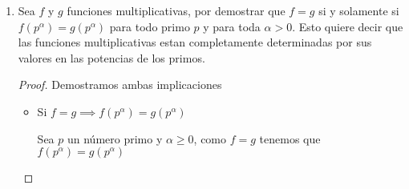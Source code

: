 \documentclass[12pt]{article}
\begin{document}
\begin{enumerate}
\begin{proof}
\begin{itemize}
                \begin{align*}
                    f(ab) &= f((p_1^{\alpha_1} \cdot p_2^{\alpha_2} \cdot \cdot \cdot p_s^{\alpha_s}) (q_1^{\beta_1} \cdot q_2^{\beta_2} \cdot \cdot \cdot q_r^{\beta_r}))\\
                          &= f(p_1^{\alpha_1}) \cdot f(p_2^{\alpha_2}) \cdot \cdot \cdot f(p_s^{\alpha_s})  f(q_1^{\beta_1}) \cdot f(q_2^{\beta_2}) \cdot \cdot \cdot f(q_r^{\beta_r}) \\
                          &= (f(p_1^{\alpha_1}) \cdot f(p_2^{\alpha_2}) \cdot \cdot \cdot f(p_s^{\alpha_s}))  (f(q_1^{\beta_1}) \cdot f(q_2^{\beta_2}) \cdot \cdot \cdot f(q_r^{\beta_r})) \\
                          &= f(p_1^{\alpha_1} \cdot p_2^{\alpha_2} \cdot \cdot \cdot p_s^{\alpha_s}) f( q_1^{\beta_1} \cdot q_2^{\beta_2} \cdot \cdot \cdot q_r^{\beta_r}) \\
                          &= f(a)f(b)
                \end{align*}
                
            Por lo tanto f es multiplicativa
        \end{itemize}
        
        Dado lo anterior concluimos que $f$ es multiplicativa si y solamente si $f(p_1^{\alpha_1} \cdot \cdot \cdot p_s^{\alpha_s}) = f(p_1^{\alpha_1}) \cdot \cdot \cdot f(p_s^{\alpha_s})$ para cualesquiera $p_i$ primos y $\alpha_i \geq 0$
        
        \end{proof}
        
        
        
        \item Sea $f$ y $g$ funciones multiplicativas, por demostrar que $f = g$ si y solamente si $f(p^{\alpha}) = g(p^{\alpha})$ para todo primo $p$ y para toda $\alpha > 0$. Esto quiere decir que las funciones multiplicativas estan completamente determinadas por sus valores en las potencias de los primos.
        
        \begin{proof}
        
        Demostramos ambas implicaciones
        
        \begin{itemize}
            \item Si $f = g \implies f(p^{\alpha}) = g(p^{\alpha})$
            
            Sea $p$ un número primo y $\alpha \geq 0$, como $f = g$ tenemos que $f(p^{\alpha}) = g(p^{\alpha})$
            

\end{itemize}
\end{proof}
\end{enumerate}
\end{document}
